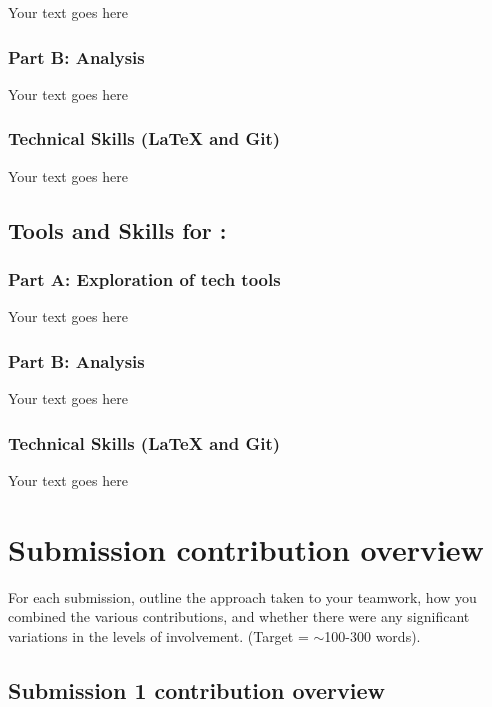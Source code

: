 \documentclass[a4paper, 11pt]{report}
\begin{document}
Your text goes here

\subsubsection{Part B: Analysis}

Your text goes here

\subsubsection{Technical Skills (LaTeX and Git)}

Your text goes here



\subsection{Tools and Skills for \majD: \studD}

\subsubsection{Part A: Exploration of tech tools}

Your text goes here

\subsubsection{Part B: Analysis}

Your text goes here

\subsubsection{Technical Skills (LaTeX and Git)}

Your text goes here



\newpage
\section{Submission contribution overview}

For each submission, outline the approach taken to your teamwork, how you combined the various contributions, and whether there were any significant variations in the levels of involvement. (Target = $\sim$100-300 words).

\subsection{Submission 1 contribution overview}
\end{document}
